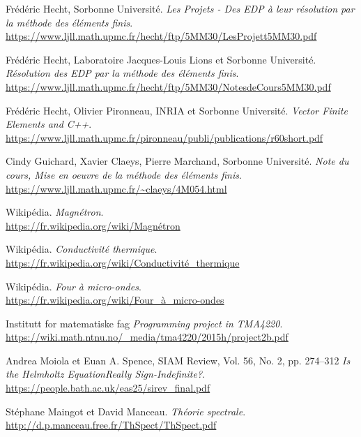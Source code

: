 \begin{thebibliography}{9}

    Frédéric Hecht, Sorbonne Université.
    \textit{Les Projets - Des EDP à leur résolution par la méthode des éléments finis}. \\
    \url{https://www.ljll.math.upmc.fr/hecht/ftp/5MM30/LesProjett5MM30.pdf}

    Frédéric Hecht, Laboratoire Jacques-Louis Lions et Sorbonne Université.
    \textit{Résolution des EDP par la méthode des éléments finis}. \\
    \url{https://www.ljll.math.upmc.fr/hecht/ftp/5MM30/NotesdeCours5MM30.pdf}

    Frédéric Hecht, Olivier Pironneau, INRIA et Sorbonne Université.
    \textit{Vector Finite Elements and C++}. \\
    \url{https://www.ljll.math.upmc.fr/pironneau/publi/publications/r60short.pdf}

    Cindy Guichard, Xavier Claeys, Pierre Marchand, Sorbonne Université.
    \textit{Note du cours, Mise en oeuvre de la méthode des éléments finis}. \\
    \url{https://www.ljll.math.upmc.fr/~claeys/4M054.html}

    Wikipédia.
    \textit{Magnétron}. \\
    \url{https://fr.wikipedia.org/wiki/Magnétron}

    Wikipédia.
    \textit{Conductivité thermique}. \\
    \url{https://fr.wikipedia.org/wiki/Conductivité_thermique}

    Wikipédia.
    \textit{Four à micro-ondes}. \\
    \url{https://fr.wikipedia.org/wiki/Four_à_micro-ondes}

    Institutt for matematiske fag
    \textit{Programming project in TMA4220}. \\
    \url{https://wiki.math.ntnu.no/_media/tma4220/2015h/project2b.pdf}

    Andrea Moiola et Euan A. Spence, SIAM Review, Vol. 56, No. 2, pp. 274–312
    \textit{Is the Helmholtz EquationReally Sign-Indefinite?}. \\
    \url{https://people.bath.ac.uk/eas25/sirev_final.pdf}

    Stéphane Maingot et David Manceau.
    \textit{Théorie spectrale}. \\
    \url{http://d.p.manceau.free.fr/ThSpect/ThSpect.pdf}


\end{thebibliography}
